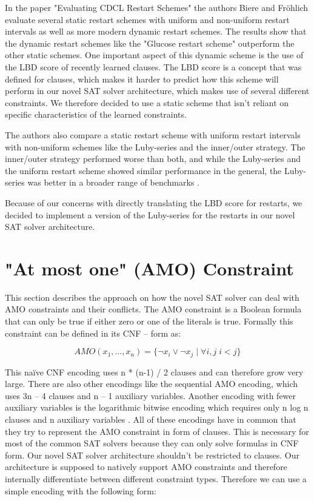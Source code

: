 In the paper "Evaluating CDCL Restart Schemes" \cite{biere2015evaluatingRestarts} the authors Biere and Fröhlich evaluate several static restart schemes with uniform and non-uniform restart intervals as well as more modern dynamic restart schemes. The results show that the dynamic restart schemes like the "Glucose restart scheme" \cite{biere2015evaluatingRestarts} outperform the other static schemes. One important aspect of this dynamic scheme is the use of the LBD score of recently learned clauses. The LBD score is a concept that was defined for clauses, which makes it harder to predict how this scheme will perform in our novel SAT solver architecture, which makes use of several different constraints. We therefore decided to use a static scheme that isn't reliant on specific characteristics of the learned constraints.

The authors also compare a static restart scheme with uniform restart intervals with non-uniform schemes like the Luby-series and the inner/outer strategy. The inner/outer strategy performed worse than both, and while the Luby-series and the uniform restart scheme showed similar performance in the general, the Luby-series was better in a broader range of benchmarks \cite{biere2015evaluatingRestarts}.

Because of our concerns with directly translating the LBD score for restarts, we decided to implement a version of the Luby-series for the restarts in our novel SAT solver architecture.

\section{"At most one" (AMO) Constraint}
\label{sec:AMOConstraint}

This section describes the approach on how the novel SAT solver can deal with AMO constraints and their conflicts. The AMO constraint is a Boolean formula that can only be true if either zero or one of the literals is true.  Formally this constraint can be defined in its CNF – form as:

\begin{leftbar}
\begin{displaymath}
AMO(x_1, ..., x_n)= \{\neg x_i \vee \neg x_j \; | \; \forall i, j \; i < j\}
\end{displaymath}
\end{leftbar}

This naïve CNF encoding uses n * (n-1) / 2 clauses and can therefore grow very large. There are also other encodings like the sequential AMO encoding, which uses 3n – 4 clauses and n – 1 auxiliary variables. Another encoding with fewer auxiliary variables is the logarithmic bitwise encoding which requires only n log n clauses and n auxiliary variables \cite{chen2010new}. All of these encodings have in common that they try to represent the AMO constraint in form of clauses. This is necessary for most of the common SAT solvers because they can only solve formulas in CNF form. Our novel SAT solver architecture shouldn’t be restricted to clauses. Our architecture is supposed to natively support AMO constraints and therefore internally differentiate between different constraint types. Therefore we can use a simple encoding with the following form:

